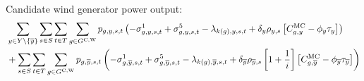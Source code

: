 \documentclass{article}
\begin{document}
Candidate wind generator power output:
\begin{align}
	& \sum\limits_{\iYear \in \sYears 
		\setminus \{\iYearTerminal\}
	}\sum\limits_{\iScenario \in \sScenarios}\sum\limits_{\iInterval \in \sIntervals} \sum\limits_{\iGenerator \in \sGeneratorsCandidateWind} \vPower\left(-\dMinPowerOutput + \dMaxPowerOutputWindCandidate 
	- \dPowerBalance[k(\iGenerator),\iYear,\iScenario,\iInterval] + \cDiscountRate \cScenarioDuration \left[\cMarginalCost - \vBaseline\vPermitPrice \right]
	\right) \nonumber\\
	& + \sum\limits_{\iScenario \in \sScenarios} \sum\limits_{\iInterval \in \sIntervals} \sum\limits_{\iGenerator \in \sGeneratorsCandidateWind} \vPower[\iGenerator,\iYearTerminal,\iScenario,\iInterval] \left(-\dMinPowerOutput[\iGenerator,\iYearTerminal,\iScenario,\iInterval] + \dMaxPowerOutputWindCandidate[\iGenerator,\iYearTerminal,\iScenario,\iInterval] - \dPowerBalance[k(\iGenerator),\iYearTerminal,\iScenario,\iInterval] + \cDiscountRate[\iYearTerminal] \cScenarioDuration[\iYearTerminal,\iScenario] \left[1 + \frac{1}{\cInterestRate}\right] \left[\cMarginalCost[\iGenerator,\iYearTerminal] - \vBaseline[\iYearTerminal]\vPermitPrice[\iYearTerminal] \right] \right)\nonumber\\
\end{align}
\end{document}
